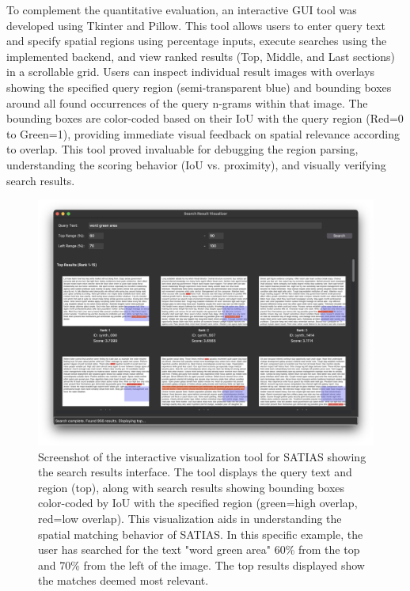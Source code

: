 \documentclass[manuscript,screen]{acmart}
\begin{document}
To complement the quantitative evaluation, an interactive GUI tool was developed using Tkinter and Pillow. This tool allows users to enter query text and specify spatial regions using percentage inputs, execute searches using the implemented backend, and view ranked results (Top, Middle, and Last sections) in a scrollable grid. Users can inspect individual result images with overlays showing the specified query region (semi-transparent blue) and bounding boxes around all found occurrences of the query n-grams within that image. The bounding boxes are color-coded based on their IoU with the query region (Red=0 to Green=1), providing immediate visual feedback on spatial relevance according to overlap. This tool proved invaluable for debugging the region parsing, understanding the scoring behavior (IoU vs. proximity), and visually verifying search results.

\begin{figure}
    \centering
    \includegraphics[width=\linewidth]{visualization_tool.png}
    \caption{Screenshot of the interactive visualization tool for SATIAS showing the search results interface. The tool displays the query text and region (top), along with search results showing bounding boxes color-coded by IoU with the specified region (green=high overlap, red=low overlap). This visualization aids in understanding the spatial matching behavior of SATIAS. In this specific example, the user has searched for the text "word green area" 60\% from the top and 70\% from the left of the image. The top results displayed show the matches deemed most relevant.}
    \label{fig:visualization-tool}
\end{figure}
\end{document}
